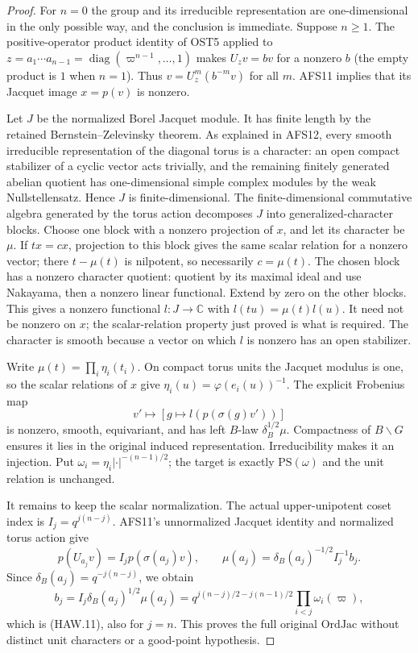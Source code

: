 \documentclass[11pt,a4paper]{article}
\numberwithin{equation}{section}
\theoremstyle{remark}\newtheorem{remark}[theorem]{Remark}
\begin{document}
\begin{proof}
For $n=0$ the group and its irreducible representation are
one-dimensional in the only possible way, and the conclusion
is immediate.  Suppose $n\ge1$.  The positive-operator
product identity of OST5 applied to
$z=a_1\cdots a_{n-1}=\operatorname{diag}
(\varpi^{n-1},\ldots,1)$ makes $U_zv=bv$ for a nonzero
$b$ (the empty product is $1$ when $n=1$).  Thus
$v=U_z^m(b^{-m}v)$ for all $m$.  AFS11 implies that its
Jacquet image $x=p(v)$ is nonzero.

Let $J$ be the normalized Borel Jacquet module.  It has finite
length by the retained Bernstein--Zelevinsky theorem.  As
explained in AFS12, every smooth irreducible representation
of the diagonal torus is a character: an open compact
stabilizer of a cyclic vector acts trivially, and the
remaining finitely generated abelian quotient has
one-dimensional simple complex modules by the weak
Nullstellensatz.  Hence $J$ is finite-dimensional.
The finite-dimensional commutative algebra generated by the
torus action decomposes $J$ into generalized-character blocks.
Choose one block with a nonzero projection of $x$, and let
its character be $\mu$.  If $t x=cx$, projection to this
block gives the same scalar relation for a nonzero vector;
there $t-\mu(t)$ is nilpotent, so necessarily $c=\mu(t)$.
The chosen block has a nonzero character quotient: quotient
by its maximal ideal and use Nakayama, then a nonzero linear
functional.  Extend by zero on the other blocks.  This gives
a nonzero functional $l:J\to\mathbb C$ with
$l(tu)=\mu(t)l(u)$.  It need not be nonzero on $x$; the
scalar-relation property just proved is what is required.
The character is smooth because a vector on which $l$ is
nonzero has an open stabilizer.

Write $\mu(t)=\prod_i\eta_i(t_i)$.  On compact torus units
the Jacquet modulus is one, so the scalar relations of $x$
give $\eta_i(u)=\varphi(e_i(u))^{-1}$.  The explicit
Frobenius map
\[
        v'\longmapsto [g\longmapsto l(p(\sigma(g)v'))]
 \tag{HAW.12}
\]
is nonzero, smooth, equivariant, and has left $B$-law
$\delta_B^{1/2}\mu$.  Compactness of $B\backslash G$
ensures it lies in the original induced representation.
Irreducibility makes it an injection.  Put
$\omega_i=\eta_i|\cdot|^{-(n-1)/2}$; the target is exactly
$\mathrm{PS}(\omega)$ and the unit relation is unchanged.

It remains to keep the scalar normalization.  The actual
upper-unipotent coset index is $I_j=q^{j(n-j)}$.  AFS11's
unnormalized Jacquet identity and normalized torus action give
\[
 p(U_{a_j}v)=I_jp(\sigma(a_j)v),\qquad
 \mu(a_j)=\delta_B(a_j)^{-1/2}I_j^{-1}b_j.
\]
Since $\delta_B(a_j)=q^{-j(n-j)}$, we obtain
\[
 b_j=I_j\delta_B(a_j)^{1/2}\mu(a_j)
     =q^{j(n-j)/2-j(n-1)/2}\prod_{i<j}\omega_i(\varpi),
\]
which is (HAW.11), also for $j=n$.  This proves the full
original $\mathrm{OrdJac}$ without distinct unit characters
or a good-point hypothesis.
\end{proof}
\end{document}
